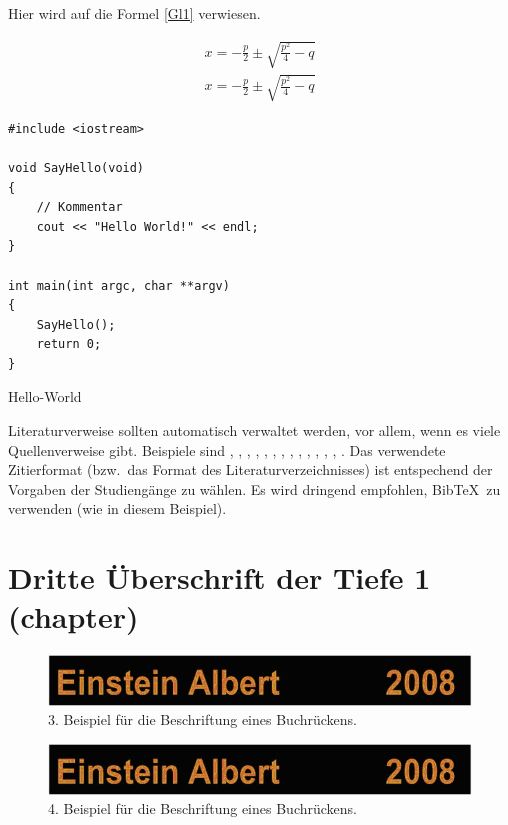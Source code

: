 \documentclass[MMR,Master,english]{twbook}%
\begin{document}
Hier wird auf die Formel \ref{Gl1} verwiesen.

\begin{align}
x = -\frac{p}{2}\pm\sqrt{\frac{p^2}{4}-q}\label{Gl1}
\end{align}
\begin{align}
x = -\frac{p}{2}\pm\sqrt{\frac{p^2}{4}-q}\label{Gl2}
\end{align}

\begin{listing}[htbp]
\begin{verbatim}
#include <iostream>

void SayHello(void)
{
    // Kommentar
    cout << "Hello World!" << endl;
}

int main(int argc, char **argv)
{
    SayHello();
    return 0;
}
\end{verbatim}
\caption{Hello-World}
\end{listing}

Literaturverweise sollten automatisch verwaltet werden, vor allem, wenn es viele Quellenverweise gibt. Beispiele sind  \cite{Ko05a}, \cite{Ko05b}, \cite{MiGo05}, \cite{TeGo14}, \cite{HuHa07}, \cite{HuZi10}, \cite{ZiKu07}, \cite{He07}, \cite{SIE11}, \cite{SIE14}, \cite{ISO98}, \cite{ATM11}, \cite{Hu11}, \cite{Po10}. Das verwendete Zitierformat (bzw.~das Format des Literaturverzeichnisses) ist entspechend der Vorgaben der Studiengänge zu wählen.
Es wird dringend empfohlen, BibTeX~zu verwenden (wie in diesem Beispiel).

\chapter{Dritte Überschrift der Tiefe 1 (chapter)}
\begin{figure}[!htbp]
\centering
\includegraphics[width=0.5\linewidth]{PICs/buchruecken}
\caption{3. Beispiel für die Beschriftung eines Buchrückens.}\label{Abb3}
\end{figure}
\begin{figure}[!htbp]
\centering
\includegraphics[width=0.5\linewidth]{PICs/buchruecken}
\caption{4. Beispiel für die Beschriftung eines Buchrückens.}\label{Abb4}
\end{figure}
\end{document}
